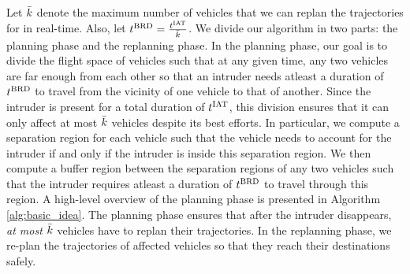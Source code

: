 Let $\bar{k}$ denote the maximum number of vehicles that we can replan the trajectories for in real-time. Also, let $t^\text{BRD} = \frac{t^\text{IAT}}{\bar{k}}$. We divide our algorithm in two parts: the planning phase and the replanning phase. In the planning phase, our goal is to divide the flight space of vehicles such that at any given time, any two vehicles are far enough from each other so that an intruder needs atleast a duration of $t^\text{BRD}$ to travel from the vicinity of one vehicle to that of another. Since the intruder is present for a total duration of $t^\text{IAT}$, this division ensures that it can only affect at most $\bar{k}$ vehicles despite its best efforts. In particular, we compute a separation region for each vehicle such that the vehicle needs to account for the intruder if and only if the intruder is inside this separation region. We then compute a buffer region between the separation regions of any two vehicles such that the intruder requires atleast a duration of $t^\text{BRD}$ to travel through this region. A high-level overview of the planning phase is presented in Algorithm \ref{alg:basic_idea}. The planning phase ensures that after the intruder disappears, \textit{at most $\bar{k}$} vehicles have to replan their trajectories. In the replanning phase, we re-plan the trajectories of affected vehicles so that they reach their destinations safely. %



